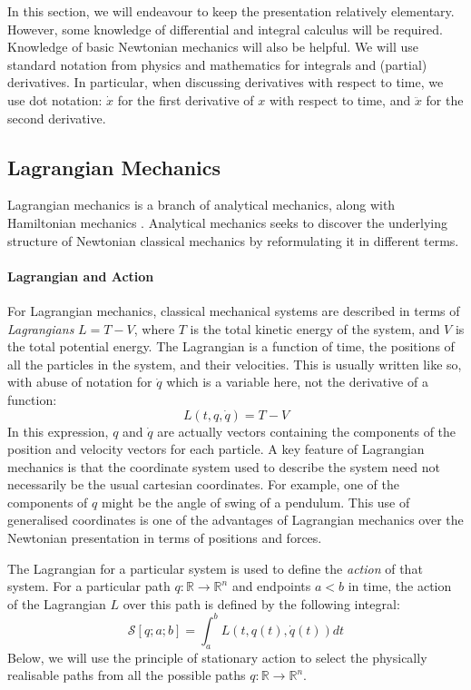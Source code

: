 \documentclass{sigplanconf}
\theoremstyle{examplestyle}
\begin{document}
In this section, we will endeavour to keep the presentation relatively
elementary. However, some knowledge of differential and integral
calculus will be required. Knowledge of basic Newtonian mechanics will
also be helpful. We will use standard notation from physics and
mathematics for integrals and (partial) derivatives. In particular,
when discussing derivatives with respect to time, we use dot notation:
$\dot{x}$ for the first derivative of $x$ with respect to time, and
$\ddot{x}$ for the second derivative.

\subsection{Lagrangian Mechanics}

Lagrangian mechanics is a branch of analytical mechanics, along with
Hamiltonian mechanics
\cite{landau60mechanics,arnold89mathematical}. Analytical mechanics
seeks to discover the underlying structure of Newtonian classical
mechanics by reformulating it in different terms.

\paragraph{Lagrangian and Action}

For Lagrangian mechanics, classical mechanical systems are described
in terms of \emph{Lagrangians} $L = T - V$, where $T$ is the total
kinetic energy of the system, and $V$ is the total potential
energy. The Lagrangian is a function of time, the positions of all the
particles in the system, and their velocities. This is usually written
like so, with abuse of notation for $\dot{q}$ which is a variable
here, not the derivative of a function:
\begin{displaymath}
  L(t, q, \dot{q}) = T - V
\end{displaymath}
In this expression, $q$ and $\dot{q}$ are actually vectors containing
the components of the position and velocity vectors for each
particle. A key feature of Lagrangian mechanics is that the coordinate
system used to describe the system need not necessarily be the usual
cartesian coordinates. For example, one of the components of $q$ might
be the angle of swing of a pendulum. This use of generalised
coordinates is one of the advantages of Lagrangian mechanics over the
Newtonian presentation in terms of positions and forces.

The Lagrangian for a particular system is used to define the
\emph{action} of that system. For a particular path $q : \mathbb{R}
\to \mathbb{R}^n$ and endpoints $a < b$ in time, the action of the
Lagrangian $L$ over this path is defined by the following integral:
\begin{displaymath}
  \mathcal{S}[q;a;b] = \int_a^b L(t,q(t),\dot{q}(t)) \mathit{dt}
\end{displaymath}
Below, we will use the principle of stationary action to select the
physically realisable paths from all the possible paths $q :
\mathbb{R} \to \mathbb{R}^n$.
\end{document}
